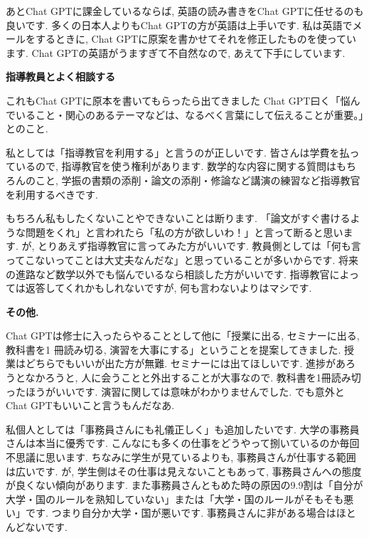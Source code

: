 あとChat GPTに課金しているならば, 英語の読み書きをChat GPTに任せるのも良いです. 多くの日本人よりもChat GPTの方が英語は上手いです. 私は英語でメールをするときに, Chat GPTに原案を書かせてそれを修正したものを使っています. Chat GPTの英語がうますぎて不自然なので, あえて下手にしています. 
 \vspace{8pt} 

\textbf{指導教員とよく相談する}  \vspace{-6pt} 

これもChat GPTに原本を書いてもらったら出てきました 
Chat GPT曰く「悩んでいること・関心のあるテーマなどは、なるべく言葉にして伝えることが重要。」とのこと. 

私としては「指導教官を利用する」と言うのが正しいです. 皆さんは学費を払っているので, 指導教官を使う権利があります.  
数学的な内容に関する質問はもちろんのこと, 学振の書類の添削・論文の添削・修論など講演の練習など指導教官を利用するべきです. 

もちろん私もしたくないことやできないことは断ります. 「論文がすぐ書けるような問題をくれ」と言われたら「私の方が欲しいわ！」と言って断ると思います. 
が, とりあえず指導教官に言ってみた方がいいです. 教員側としては「何も言ってこないってことは大丈夫なんだな」と思っていることが多いからです. 将来の進路など数学以外でも悩んでいるなら相談した方がいいです. 
指導教官によっては返答してくれかもしれないですが, 何も言わないよりはマシです. 
\vspace{8pt} 

\textbf{その他.}

Chat GPTは修士に入ったらやることとして他に「授業に出る, セミナーに出る, 教科書を1 冊読み切る, 演習を大事にする」ということを提案してきました. 授業はどちらでもいいが出た方が無難. セミナーには出てほしいです. 進捗があろうとなかろうと, 人に会うことと外出することが大事なので. 
教科書を1冊読み切ったほうがいいです. 演習に関しては意味がわかりませんでした. 
でも意外とChat GPTもいいこと言うもんだなあ.

私個人としては「事務員さんにも礼儀正しく」も追加したいです. 
大学の事務員さんは本当に優秀です. 
こんなにも多くの仕事をどうやって捌いているのか毎回不思議に思います. 
ちなみに学生が見ているよりも, 事務員さんが仕事する範囲は広いです. 
が, 学生側はその仕事は見えないこともあって, 事務員さんへの態度が良くない傾向があります. 
また事務員さんともめた時の原因の9.9割は「自分が大学・国のルールを熟知していない」または「大学・国のルールがそもそも悪い」です. つまり自分か大学・国が悪いです. 事務員さんに非がある場合はほとんどないです. 

